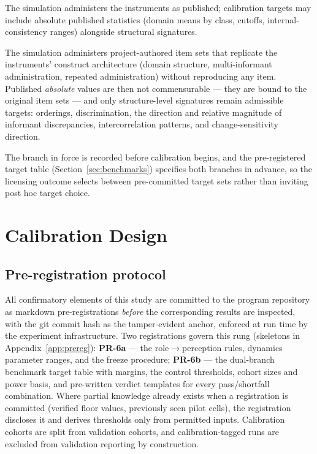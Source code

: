 \documentclass[12pt, letterpaper]{article}
\begin{document}
\begin{description}[nosep]
    \item[Branch A (authorized item text).] The simulation administers the instruments as published; calibration targets may include absolute published statistics (domain means by class, cutoffs, internal-consistency ranges) alongside structural signatures.
    \item[Branch B (construct-architecture replication).] The simulation administers project-authored item sets that replicate the instruments' construct architecture (domain structure, multi-informant administration, repeated administration) without reproducing any item. Published \emph{absolute} values are then not commensurable --- they are bound to the original item sets --- and only structure-level signatures remain admissible targets: orderings, discrimination, the direction and relative magnitude of informant discrepancies, intercorrelation patterns, and change-sensitivity direction.
\end{description}

The branch in force is recorded before calibration begins, and the pre-registered target table (Section~\ref{sec:benchmarks}) specifies both branches in advance, so the licensing outcome selects between pre-committed target sets rather than inviting post hoc target choice.

\section{Calibration Design}
\label{sec:design}

\subsection{Pre-registration protocol}
\label{sec:prereg}

All confirmatory elements of this study are committed to the program repository as markdown pre-registrations \emph{before} the corresponding results are inspected, with the git commit hash as the tamper-evident anchor, enforced at run time by the experiment infrastructure. Two registrations govern this rung (skeletons in Appendix~\ref{app:prereg}): \textbf{PR-6a} --- the role$\to$perception rules, dynamics parameter ranges, and the freeze procedure; \textbf{PR-6b} --- the dual-branch benchmark target table with margins, the control thresholds, cohort sizes and power basis, and pre-written verdict templates for every pass/shortfall combination. Where partial knowledge already exists when a registration is committed (verified floor values, previously seen pilot cells), the registration discloses it and derives thresholds only from permitted inputs. Calibration cohorts are split from validation cohorts, and calibration-tagged runs are excluded from validation reporting by construction.
\end{document}
